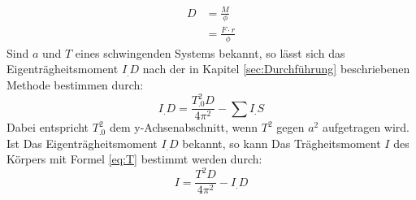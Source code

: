 \begin{align}
D 	&= \frac{M}{\phi}\nonumber\\ 
	&= \frac{F\cdot r}{\phi} \label{eq:D}
\end{align}
Sind $a$ und $T$ eines schwingenden Systems bekannt, so lässt sich das Eigenträgheitsmoment $I_.D$ nach der in Kapitel \ref{sec:Durchführung} beschriebenen Methode bestimmen durch:
\begin{equation}
I_.D = \frac{T_.0^2D}{4\pi^2}-\sum I_.S \label{eq:I_D}
\end{equation}
Dabei entspricht $T_.0^2$ dem y-Achsenabschnitt, wenn $T^2$ gegen $a^2$ aufgetragen wird.
Ist Das Eigenträgheitsmoment $I_.D$ bekannt, so kann Das Trägheitsmoment $I$ des Körpers mit Formel \eqref{eq:T} bestimmt werden durch:
\begin{equation}
I = \frac{T^2D}{4\pi^2}-I_.D  \label{eq:I_K}
\end{equation}